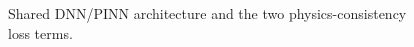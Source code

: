 \begin{figure}[!htbp]
\centering
{}
\caption{Shared DNN/PINN architecture and the two physics-consistency loss terms.}
\label{fig:model-architecture}
\end{figure}

